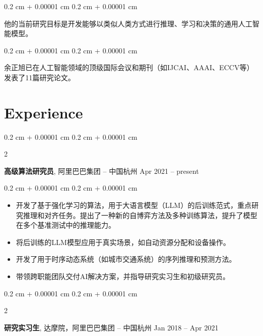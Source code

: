 \documentclass[10pt, letterpaper]{article}
\newenvironment{highlights}{
    \begin{itemize}[
        topsep=0.10 cm,
        parsep=0.10 cm,
        partopsep=0pt,
        itemsep=0pt,
        leftmargin=0.4 cm + 10pt
    ]
}{
    \end{itemize}
} %
\newenvironment{onecolentry}{
    \begin{adjustwidth}{
        0.2 cm + 0.00001 cm
    }{
        0.2 cm + 0.00001 cm
    }
}{
    \end{adjustwidth}
} %
\newenvironment{twocolentry}[2][]{
    \onecolentry
    \def\secondColumn{#2}
    \setcolumnwidth{\fill, 4.5 cm}
    \begin{paracol}{2}
}{
    \switchcolumn \raggedleft \secondColumn
    \end{paracol}
    \endonecolentry
} %
\begin{document}
        \vspace{0.2 cm}

        \begin{onecolentry}
            他的当前研究目标是开发能够以类似人类方式进行推理、学习和决策的通用人工智能模型。
        \end{onecolentry}

        \vspace{0.2 cm}

        \begin{onecolentry}
            余正旭已在人工智能领域的顶级国际会议和期刊（如IJCAI、AAAI、ECCV等）发表了11篇研究论文。
        \end{onecolentry}


    
    \section{Experience}



        
        \begin{twocolentry}{
            Apr 2021 – present
        }
            \textbf{高级算法研究员}, 阿里巴巴集团 -- 中国杭州\end{twocolentry}

        \vspace{0.10 cm}
        \begin{onecolentry}
            \begin{highlights}
                \item 开发了基于强化学习的算法，用于大语言模型（LLM）的后训练范式，重点研究推理和对齐任务。提出了一种新的自博弈方法及多种训练算法，提升了模型在多个基准测试中的推理能力。
                \item 将后训练的LLM模型应用于真实场景，如自动资源分配和设备操作。
                \item 开发了用于时序动态系统（如城市交通系统）的序列推理和预测方法。
                \item 带领跨职能团队交付AI解决方案，并指导研究实习生和初级研究员。
            \end{highlights}
        \end{onecolentry}


        \vspace{0.2 cm}

        \begin{twocolentry}{
            Jan 2018 – Apr 2021
        }
            \textbf{研究实习生}, 达摩院，阿里巴巴集团 -- 中国杭州\end{twocolentry}
\end{document}
